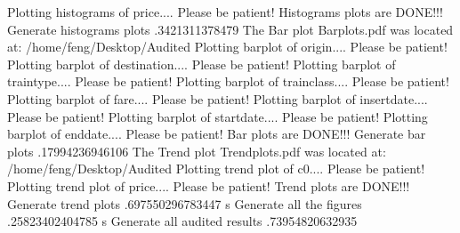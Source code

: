 \documentclass[letterpaper,12pt,english]{sphinxmanual}
\begin{document}
\begin{sphinxVerbatim}[commandchars=\\\{\}]
Plotting histograms of price.... Please be patient!
Histograms plots are DONE!!!
Generate histograms plots   .3421311378479 
The Bar plot Bar\PYGZus{}plots.pdf was located at:
/home/feng/Desktop/Audited
Plotting barplot of origin.... Please be patient!
Plotting barplot of destination.... Please be patient!
Plotting barplot of train\PYGZus{}type.... Please be patient!
Plotting barplot of train\PYGZus{}class.... Please be patient!
Plotting barplot of fare.... Please be patient!
Plotting barplot of insert\PYGZus{}date.... Please be patient!
Plotting barplot of start\PYGZus{}date.... Please be patient!
Plotting barplot of end\PYGZus{}date.... Please be patient!
Bar plots are DONE!!!
Generate bar plots   .17994236946106 
The Trend plot Trend\PYGZus{}plots.pdf was located at:
/home/feng/Desktop/Audited
Plotting trend plot of \PYGZus{}c0.... Please be patient!
Plotting trend plot of price.... Please be patient!
Trend plots are DONE!!!
Generate trend plots   .697550296783447 s
Generate all the figures   .25823402404785 s
Generate all audited results   .73954820632935 

\end{sphinxVerbatim}
\end{document}
